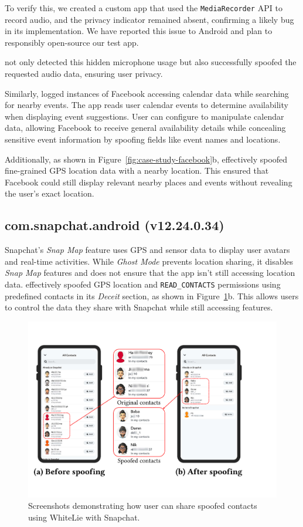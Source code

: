 To verify this, we created a custom app that used the \texttt{MediaRecorder} API to record audio, and the privacy indicator remained absent, confirming a likely bug in its implementation. We have reported this issue to Android and plan to responsibly open-source our test app.

\framework{} not only detected this hidden microphone usage but also successfully spoofed the requested audio data, ensuring user privacy.

Similarly, \framework{} logged instances of Facebook accessing calendar data while searching for nearby events. The app reads user calendar events to determine availability when displaying event suggestions. User can configure \framework{} to manipulate calendar data, allowing Facebook to receive general availability details while concealing sensitive event information by spoofing fields like event names and locations.

Additionally, as shown in Figure~\ref{fig:case-study-facebook}b, \framework{} effectively spoofed fine-grained GPS location data with a nearby location. This ensured that Facebook could still display relevant nearby places and events without revealing the user’s exact location.

\subsection{com.snapchat.android (v12.24.0.34)}
\label{sec:sc_case_study}

Snapchat's \textit{Snap Map} feature uses GPS and sensor data to display user avatars and real-time activities. While \textit{Ghost Mode} prevents location sharing, it disables \textit{Snap Map} features and does not ensure that the app isn't still accessing location data. \framework{} effectively spoofed GPS location and \texttt{READ\_CONTACTS} permissions using predefined contacts in its \textit{Deceit} section, as shown in Figure~\ref{fig:case-study-snapchat}b. This allows users to control the data they share with Snapchat while still accessing 
features.

\vspace{-15pt}
\begin{figure}
    \centering
    \includegraphics[width=0.75\linewidth]{Figures/Case Studies/snapchat_screenshots.pdf}
    \caption{Screenshots demonstrating how user can share spoofed contacts using WhiteLie with Snapchat.}
    \label{fig:case-study-snapchat}
\end{figure}
\vspace{-30pt}

